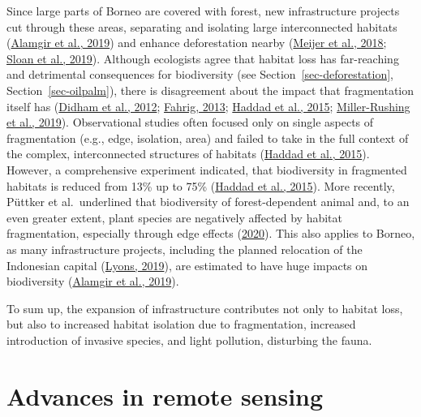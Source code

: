 \documentclass[
  letterpaper,
  DIV=11,
  numbers=noendperiod]{scrreprt}
\begin{document}
Since large parts of Borneo are covered with forest, new infrastructure
projects cut through these areas, separating and isolating large
interconnected habitats
(\protect\hyperlink{ref-alamgirHighriskInfrastructureProjects2019}{Alamgir
et al., 2019}) and enhance deforestation nearby
(\protect\hyperlink{ref-meijerGlobalPatternsCurrent2018}{Meijer et al.,
2018};
\protect\hyperlink{ref-sloanHiddenChallengesConservation2019}{Sloan et
al., 2019}). Although ecologists agree that habitat loss has
far-reaching and detrimental consequences for biodiversity (see
Section~\ref{sec-deforestation}, Section~\ref{sec-oilpalm}), there is
disagreement about the impact that fragmentation itself has
(\protect\hyperlink{ref-didhamRethinkingConceptualFoundations2012a}{Didham
et al., 2012};
\protect\hyperlink{ref-fahrigRethinkingPatchSize2013}{Fahrig, 2013};
\protect\hyperlink{ref-haddadHabitatFragmentationIts2015a}{Haddad et
al., 2015};
\protect\hyperlink{ref-miller-rushingHowDoesHabitat2019}{Miller-Rushing
et al., 2019}). Observational studies often focused only on single
aspects of fragmentation (e.g., edge, isolation, area) and failed to
take in the full context of the complex, interconnected structures of
habitats
(\protect\hyperlink{ref-haddadHabitatFragmentationIts2015a}{Haddad et
al., 2015}). However, a comprehensive experiment indicated, that
biodiversity in fragmented habitats is reduced from 13\% up to 75\%
(\protect\hyperlink{ref-haddadHabitatFragmentationIts2015a}{Haddad et
al., 2015}). More recently, Püttker et al.~underlined that biodiversity
of forest-dependent animal and, to an even greater extent, plant species
are negatively affected by habitat fragmentation, especially through
edge effects
(\protect\hyperlink{ref-puttkerIndirectEffectsHabitat2020}{2020}). This
also applies to Borneo, as many infrastructure projects, including the
planned relocation of the Indonesian capital
(\protect\hyperlink{ref-lyonsWhyIndonesiaMoving2019}{Lyons, 2019}), are
estimated to have huge impacts on biodiversity
(\protect\hyperlink{ref-alamgirHighriskInfrastructureProjects2019}{Alamgir
et al., 2019}).

To sum up, the expansion of infrastructure contributes not only to
habitat loss, but also to increased habitat isolation due to
fragmentation, increased introduction of invasive species, and light
pollution, disturbing the fauna.

\hypertarget{sec-remotesensing}{%
\section{Advances in remote sensing}\label{sec-remotesensing}}
\end{document}
